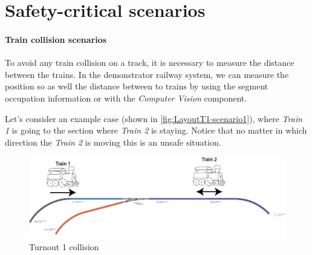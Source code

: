 \section{Safety-critical scenarios}
\paragraph{Train collision scenarios} 
To avoid any train collision on a track, it is necessary to measure the distance between the trains. In the demonstrator railway system, we can measure the position so as well the distance between to trains by using the segment occupation information or with the \textit{Computer Vision} component. 

Let's consider an example case (shown in \autoref{fig:LayoutT1-scenario1}), where \textit{Train 1} is going to the section where \textit{Train 2} is staying. Notice that no matter in which direction the \textit{Train 2} is moving this is an unsafe situation.
\begin{figure}[ht]
	\centering
	\includegraphics[width=150mm, keepaspectratio]{figures/modes3/layoutT1-scenario2.png}
	\caption{Turnout 1 collision }
	\label{fig:LayoutT1-scenario1}
\end{figure}

